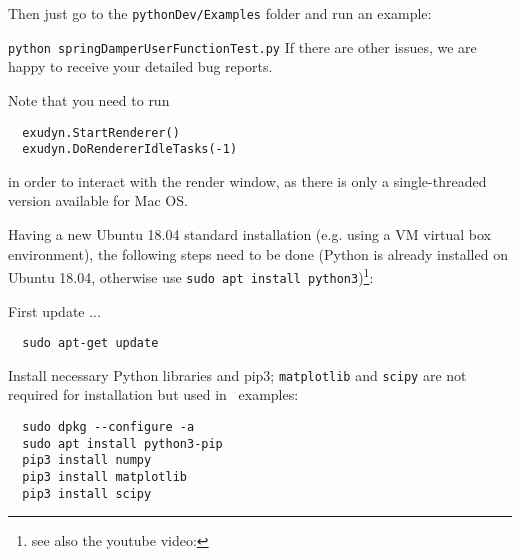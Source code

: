 \ei
Then just go to the \texttt{pythonDev/Examples} folder and run an example:
\bi
  \item[] \texttt{python springDamperUserFunctionTest.py}
\ei
If there are other issues, we are happy to receive your detailed bug reports. 

\noindent Note that you need to run 
\pythonstyle\begin{lstlisting}
  exudyn.StartRenderer()
  exudyn.DoRendererIdleTasks(-1)
\end{lstlisting}
in order to interact with the render window, as there is only a single-threaded version available for Mac OS.

%
Having a new Ubuntu 18.04 standard installation (e.g. using a VM virtual box environment), the following steps need to be done (Python  is already installed on Ubuntu 18.04, otherwise use \texttt{sudo apt install python3})\footnote{see also the youtube video: }:

\noindent First update ...
\plainlststyle
\begin{lstlisting}
  sudo apt-get update
\end{lstlisting}

\noindent 
Install necessary Python libraries and pip3; \texttt{matplotlib} and \texttt{scipy} are not required for installation but used in \codeName\ examples:
\begin{lstlisting}
  sudo dpkg --configure -a
  sudo apt install python3-pip
  pip3 install numpy
  pip3 install matplotlib
  pip3 install scipy
\end{lstlisting}

